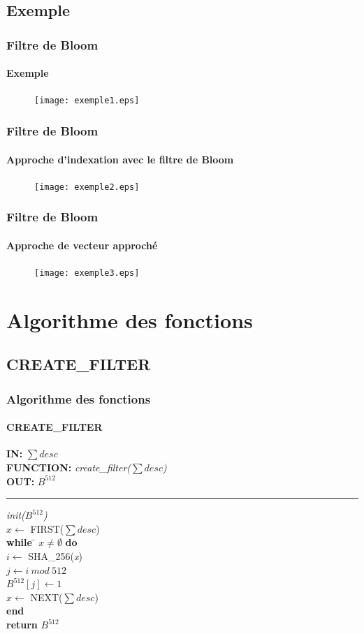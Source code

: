 \documentclass[hyperref={pdfpagemode=FullScreen,colorlinks=true},xcolor=pst,dvips]{beamer}\usepackage[french]{babel}
\begin{document}
	\subsection{Exemple}
	\begin{frame}
		\frametitle{Filtre de Bloom}
		\framesubtitle{Exemple}
		\begin{figure}[!htbp]
			\centering
			\texttt{[image: exemple1.eps]}
		\end{figure}	
	\end{frame}
	
	\begin{frame}
		\frametitle{Filtre de Bloom}
		\framesubtitle{Approche d'indexation avec le filtre de Bloom}
		\begin{figure}[!htbp]
			\centering
			\texttt{[image: exemple2.eps]}
		\end{figure}	
	\end{frame}
	
	\begin{frame}
		\frametitle{Filtre de Bloom}
		\framesubtitle{Approche de vecteur approché}
		\begin{figure}[!htbp]
			\centering
			\texttt{[image: exemple3.eps]}
		\end{figure}	
	\end{frame}
	
	\section{Algorithme des fonctions}
	\subsection{CREATE\_FILTER}
	\begin{frame}[shrink]
		\frametitle{Algorithme des fonctions}
		\framesubtitle{CREATE\_FILTER}
		\begin{framed}
		\textbf{IN:} $\sum desc$\\
		\textbf{FUNCTION:} \textit{create\_filter($\sum desc$)}\\
		\textbf{OUT:} \textit{$B^{512}$}\\

		\noindent\rule{\linewidth}{0.5pt}

		\begin{tabbing}
			\textit{init($B^{512}$)}\\
			$x \leftarrow$ FIRST($\sum desc$)\\
			\textbf{while} \= $x \neq \emptyset$ \textbf{do}\\
					\> $i \leftarrow$ SHA\_256(\textit{x})\\
					\> $j \leftarrow i\ mod\ 512$\\
					\> $B^{512}[j]\leftarrow 1$\\
					\> $x \leftarrow$ NEXT($\sum desc$)\\
			\textbf{end}\\
			\textbf{return} $B^{512}$\\
	    	\end{tabbing}		
	\end{framed}
	\end{frame}
	
\end{document}
